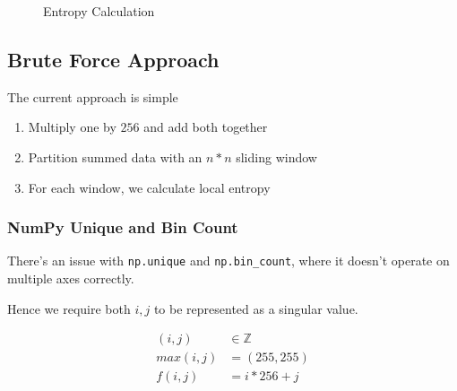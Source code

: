 \documentclass[article,oneside]{memoir}
\begin{document}
\begin{figure}[H]
\centering
{}
\caption{Entropy Calculation}
\label{Entropy Calculation}
\end{figure}

\subsection{Brute Force Approach}

The current approach is simple

\begin{enumerate}
\item{Multiply one by $256$ and add both together}
\item{Partition summed data with an $n*n$ sliding window}
\item{For each window, we calculate local entropy}
\end{enumerate}

\subsubsection{NumPy Unique and Bin Count}

There's an issue with \verb+np.unique+ and \verb+np.bin_count+, where it doesn't operate on multiple axes correctly.

Hence we require both $i, j$ to be represented as a singular value.

\begin{align*}
(i, j) &\in \mathbb{Z}\\
max(i, j) &= (255, 255)\\
f(i, j)   &= i * 256 + j\\
\end{align*}
\end{document}
